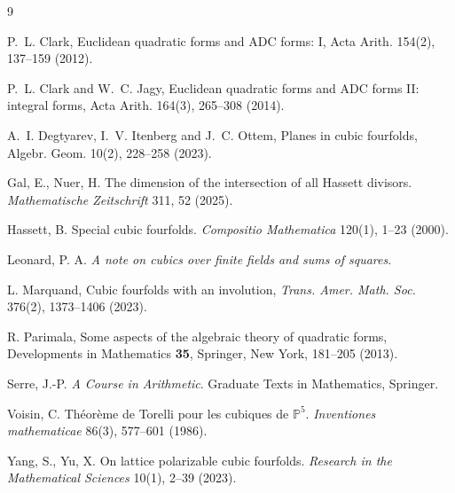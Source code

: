 \documentclass[11pt,letterpaper]{amsart} %
\theoremstyle{definition}
\begin{document}
\begin{thebibliography}{9}

P.~L. Clark, Euclidean quadratic forms and ADC forms: I, Acta Arith. 154(2), 137--159 (2012).

P.~L. Clark and W.~C. Jagy, Euclidean quadratic forms and ADC forms II: integral forms, Acta Arith. 164(3), 265--308  (2014).

A.~I. Degtyarev, I.~V. Itenberg and J.~C. Ottem, Planes in cubic fourfolds, Algebr. Geom. 10(2), 228--258 (2023).

Gal, E., Nuer, H. The dimension of the intersection of all Hassett divisors. \emph{Mathematische Zeitschrift} 311, 52 (2025). 

Hassett, B. Special cubic fourfolds. \emph{Compositio Mathematica} 120(1), 1--23 (2000). 

Leonard, P. A. \emph{A note on cubics over finite fields and sums of squares}. 


L. Marquand, Cubic fourfolds with an involution, \emph{Trans. Amer. Math. Soc.} 376(2), 1373--1406 (2023).

R. Parimala, Some aspects of the algebraic theory of quadratic forms, Developments in Mathematics \textbf{35}, Springer, New York, 181--205 (2013).

Serre, J.-P. \emph{A Course in Arithmetic}. Graduate Texts in Mathematics, Springer.

Voisin, C. Th\'eor\`eme de Torelli pour les cubiques de $\mathbb{P}^5$. \emph{Inventiones mathematicae} 86(3), 577--601 (1986). 

Yang, S., Yu, X. On lattice polarizable cubic fourfolds. \emph{Research in the Mathematical Sciences} 10(1), 2--39 (2023). 

\end{thebibliography}
\end{document}
